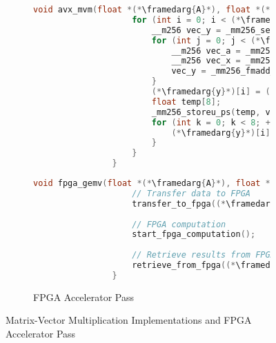 \documentclass[manuscript,screen,review]{acmart}
\newcommand{\framedarg}[1]{
	\tikz[baseline=(char.base)]
	\node[draw=blue, rectangle, inner sep=1pt, anchor=base] (char) {#1};
}
\begin{document}
\begin{figure}[h]
\begin{subfigure}[t]{0.45\textwidth}
\begin{lstlisting}[language=C++]
				void avx_mvm(float *(*\framedarg{A}*), float *(*\framedarg{x}*), float *(*\framedarg{y}*), float (*\framedarg{alpha}*), float (*\framedarg{beta}*), int (*\framedarg{lda}*), int (*\framedarg{N}*)) {
					for (int i = 0; i < (*\framedarg{N}*); ++i) {
						__m256 vec_y = _mm256_setzero_ps();
						for (int j = 0; j < (*\framedarg{N}*); j += 8) {
							__m256 vec_a = _mm256_loadu_ps(&(*\framedarg{A}*)[i * (*\framedarg{lda}*) + j]);
							__m256 vec_x = _mm256_loadu_ps(&(*\framedarg{x}*)[j]);
							vec_y = _mm256_fmadd_ps(vec_a, vec_x, vec_y);
						}
						(*\framedarg{y}*)[i] = (*\framedarg{beta}*) * (*\framedarg{y}*)[i];
						float temp[8];
						_mm256_storeu_ps(temp, vec_y);
						for (int k = 0; k < 8; ++k) {
							(*\framedarg{y}*)[i] += (*\framedarg{alpha}*) * temp[k];
						}
					}
				}
			\end{lstlisting}
		\end{subfigure}
		\hspace{1em}
		\begin{subfigure}[t]{0.45\textwidth}
			\centering
			\caption{FPGA Accelerator Pass}
			\label{lst:fpga}
			\begin{lstlisting}[language=C++]
				void fpga_gemv(float *(*\framedarg{A}*), float *(*\framedarg{x}*), float *(*\framedarg{y}*), float (*\framedarg{alpha}*), float (*\framedarg{beta}*), int (*\framedarg{lda}*), int (*\framedarg{N}*)) {
					// Transfer data to FPGA
					transfer_to_fpga((*\framedarg{A}*), (*\framedarg{x}*), (*\framedarg{y}*), (*\framedarg{alpha}*), (*\framedarg{beta}*), (*\framedarg{lda}*), (*\framedarg{N}*));
					
					// FPGA computation
					start_fpga_computation();
					
					// Retrieve results from FPGA
					retrieve_from_fpga((*\framedarg{y}*));
				}
			\end{lstlisting}
		\end{subfigure}
		\caption{Matrix-Vector Multiplication Implementations and FPGA Accelerator Pass}
		\label{fig:mvm_fpga_implementations}
	\end{figure}
	
\end{document}
